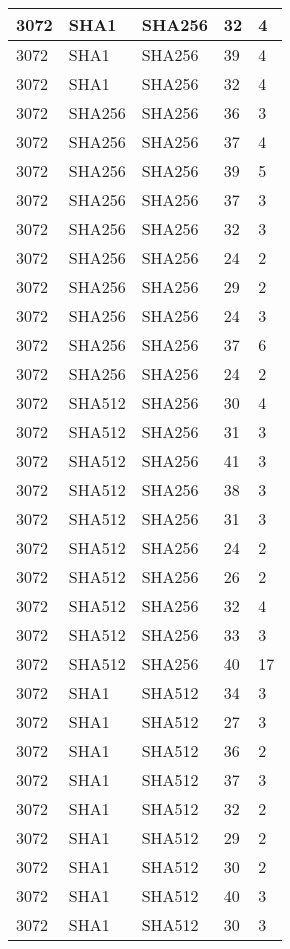 \begin{tabular}{| l | l | l | l | l |}
3072 & SHA1 & SHA256 & 32 & 4 \\ \hline 
3072 & SHA1 & SHA256 & 39 & 4 \\ \hline 
3072 & SHA1 & SHA256 & 32 & 4 \\ \hline 
3072 & SHA256 & SHA256 & 36 & 3 \\ \hline 
3072 & SHA256 & SHA256 & 37 & 4 \\ \hline 
3072 & SHA256 & SHA256 & 39 & 5 \\ \hline 
3072 & SHA256 & SHA256 & 37 & 3 \\ \hline 
3072 & SHA256 & SHA256 & 32 & 3 \\ \hline 
3072 & SHA256 & SHA256 & 24 & 2 \\ \hline 
3072 & SHA256 & SHA256 & 29 & 2 \\ \hline 
3072 & SHA256 & SHA256 & 24 & 3 \\ \hline 
3072 & SHA256 & SHA256 & 37 & 6 \\ \hline 
3072 & SHA256 & SHA256 & 24 & 2 \\ \hline 
3072 & SHA512 & SHA256 & 30 & 4 \\ \hline 
3072 & SHA512 & SHA256 & 31 & 3 \\ \hline 
3072 & SHA512 & SHA256 & 41 & 3 \\ \hline 
3072 & SHA512 & SHA256 & 38 & 3 \\ \hline 
3072 & SHA512 & SHA256 & 31 & 3 \\ \hline 
3072 & SHA512 & SHA256 & 24 & 2 \\ \hline 
3072 & SHA512 & SHA256 & 26 & 2 \\ \hline 
3072 & SHA512 & SHA256 & 32 & 4 \\ \hline 
3072 & SHA512 & SHA256 & 33 & 3 \\ \hline 
3072 & SHA512 & SHA256 & 40 & 17 \\ \hline 
3072 & SHA1 & SHA512 & 34 & 3 \\ \hline 
3072 & SHA1 & SHA512 & 27 & 3 \\ \hline 
3072 & SHA1 & SHA512 & 36 & 2 \\ \hline 
3072 & SHA1 & SHA512 & 37 & 3 \\ \hline 
3072 & SHA1 & SHA512 & 32 & 2 \\ \hline 
3072 & SHA1 & SHA512 & 29 & 2 \\ \hline 
3072 & SHA1 & SHA512 & 30 & 2 \\ \hline 
3072 & SHA1 & SHA512 & 40 & 3 \\ \hline 
3072 & SHA1 & SHA512 & 30 & 3 \\ \hline 

\end{tabular}
